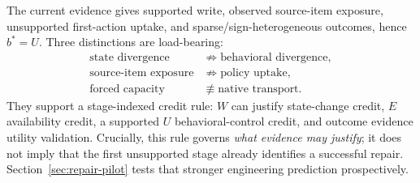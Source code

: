 The current evidence gives supported write, observed source-item exposure, unsupported first-action uptake, and sparse/sign-heterogeneous outcomes, hence $b^*=U$. Three distinctions are load-bearing:
\[
\begin{aligned}
\text{state divergence} &\not\Rightarrow \text{behavioral divergence},\\
\text{source-item exposure} &\not\Rightarrow \text{policy uptake},\\
\text{forced capacity} &\not\equiv \text{native transport}.
\end{aligned}
\]
They support a stage-indexed credit rule: $W$ can justify state-change credit, $E$ availability credit, a supported $U$ behavioral-control credit, and outcome evidence utility validation. Crucially, this rule governs \emph{what evidence may justify}; it does not imply that the first unsupported stage already identifies a successful repair. Section~\ref{sec:repair-pilot} tests that stronger engineering prediction prospectively.
